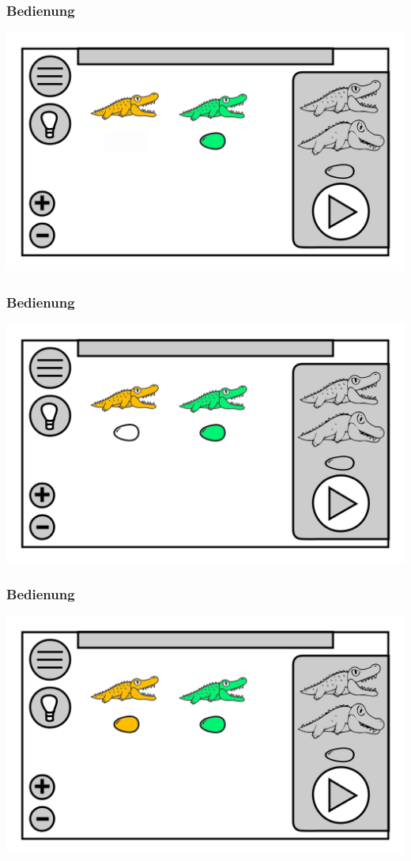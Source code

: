 \documentclass[t]{beamer}
\begin{document}
\begin{frame}
	\frametitle{Bedienung}
	\includegraphics[height=\textheight]{level_start.png}
\end{frame}
\begin{frame}
	\frametitle{Bedienung}
	\includegraphics[height=\textheight]{level_colored_croc.png}
\end{frame}
\begin{frame}
	\frametitle{Bedienung}
	\includegraphics[height=\textheight]{level_colored.png}
\end{frame}
\end{document}
